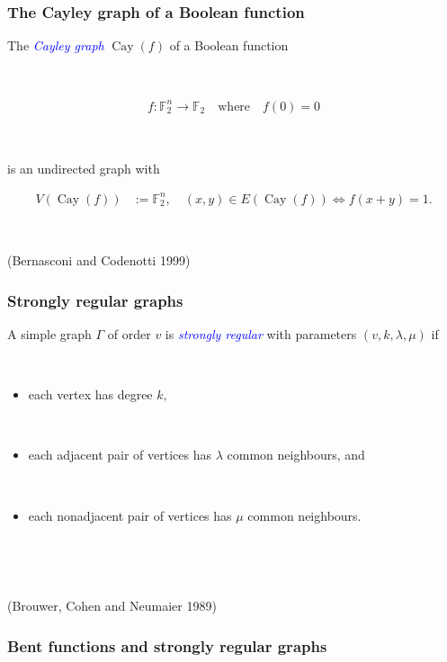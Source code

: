 \documentclass[pdf,sprung,slideColor,nocolorBG]{beamer}
\newenvironment{colortheme}[1]{
\def\ProvidesPackageRCS $##1${\relax}
\renewcommand{\ProcessOptions}{\relax}
\makeatletter

\makeatother
}{}
\newcommand{\slidecite}[1]{\tiny{(#1)}\normalsize{}}
\newcommand{\mb}[1]{\mathbb{#1}}
\newcommand{\Emph}[1]{\emph{\textcolor{blue}{#1}}}
\newcommand{\To}{\rightarrow}
\newcommand{\Cay}[1]{\operatorname{Cay}\left(#1\right)}
\newcommand{\F}{\mb{F}}
\begin{document}

\begin{colortheme}{seagull}

\begin{frame}
\frametitle{The Cayley graph of a Boolean function}
The \Emph{Cayley graph} $\Cay{f}$ of a Boolean function

~

\begin{align*}
%
f : \F_2^n \To \F_2 \quad \text{where} \quad f(0) = 0
%
\end{align*}

~

is
an undirected graph with

\begin{align*}
V(\Cay{f}) &:= \F_2^n, \quad (x,y) \in E(\Cay{f}) \Leftrightarrow f(x+y) = 1.
\end{align*}

~

\slidecite{Bernasconi and Codenotti 1999}
\end{frame}

\begin{frame}
\frametitle{Strongly regular graphs}
A simple graph $\Gamma$ of order $v$ is \Emph{strongly regular} with parameters
$(v,k,\lambda,\mu)$ if

~

\begin{itemize}
 \item
each vertex has degree $k,$

~
 \item
each adjacent pair of vertices has $\lambda$ common neighbours, and

~
\item
each nonadjacent pair of vertices has $\mu$ common neighbours.
\end{itemize}

~

~

\slidecite{Brouwer, Cohen and Neumaier 1989}

\end{frame}

\begin{frame}
\frametitle{Bent functions and strongly regular graphs}


\end{frame}
\end{colortheme}
\end{document}
